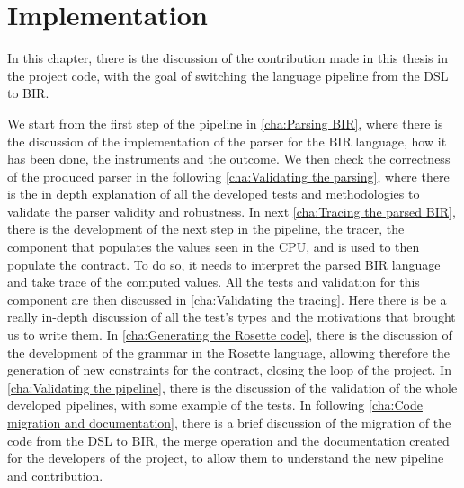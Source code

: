 \chapter{Implementation}
\label{cha:core} In this chapter, there is the discussion of the contribution
made in this thesis in the project code, with the goal of switching the language
pipeline from the DSL to BIR.

We start from the first step of the pipeline in \cref{cha:Parsing BIR}, where
there is the discussion of the implementation of the parser for the BIR language,
how it has been done, the instruments and the outcome. We then check the correctness
of the produced parser in the following \cref{cha:Validating the parsing}, where
there is the in depth explanation of all the developed tests and methodologies
to validate the parser validity and robustness. In next \cref{cha:Tracing the
parsed BIR}, there is the development of the next step in the pipeline, the tracer,
the component that populates the values seen in the CPU, and is used to then populate
the contract. To do so, it needs to interpret the parsed BIR language and take trace
of the computed values. All the tests and validation for this component are then
discussed in \cref{cha:Validating the tracing}. Here there is be a really in-depth
discussion of all the test's types and the motivations that brought us to write them.
In \cref{cha:Generating the Rosette code}, there is the discussion of the development
of the grammar in the Rosette language, allowing therefore the generation of new
constraints for the contract, closing the loop of the project. In
\cref{cha:Validating the pipeline}, there is the discussion of the validation of
the whole developed pipelines, with some example of the tests. In following \cref{cha:Code
migration and documentation}, there is a brief discussion of the migration of
the code from the DSL to BIR, the merge operation and the documentation created for
the developers of the project, to allow them to understand the new pipeline and
contribution.

